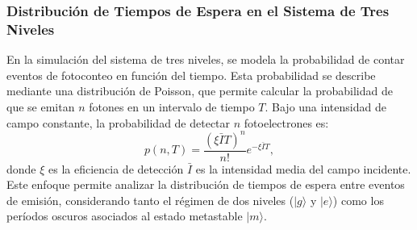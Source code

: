 \documentclass[12pt]{report}
\begin{document}
\subsubsection*{Distribución de Tiempos de Espera en el Sistema de Tres Niveles}

En la simulación del sistema de tres niveles, se modela la probabilidad de contar eventos de fotoconteo en función del tiempo. Esta probabilidad se describe mediante una distribución de Poisson, que permite calcular la probabilidad de que se emitan \( n \) fotones en un intervalo de tiempo \( T \). Bajo una intensidad de campo constante, la probabilidad de detectar \( n \) fotoelectrones es:
%
\begin{equation}
p(n, T) = \frac{(\xi \bar{I} T)^n}{n!} e^{-\xi \bar{I} T},
\end{equation}
%
donde $\xi$ es la eficiencia de detección $\bar{I}$ es la intensidad media del campo incidente. Este enfoque permite analizar la distribución de tiempos de espera entre eventos de emisión, considerando tanto el régimen de dos niveles (\( |g\rangle \) y \( |e\rangle \)) como los períodos oscuros asociados al estado metastable \( |m\rangle \).
\end{document}
